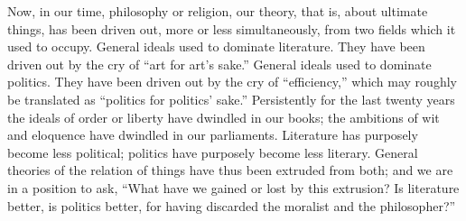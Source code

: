 Now, in our time, philosophy or religion, our theory, that is, about ultimate things, has been driven out, more or less simultaneously, from two fields which it used to occupy. General ideals used to dominate literature. They have been driven out by the cry of “art for art’s sake.” General ideals used to dominate politics. They have been driven out by the cry of “efficiency,” which may roughly be translated as “politics for politics’ sake.” Persistently for the last twenty years the ideals of order or liberty have dwindled in our books; the ambitions of wit and eloquence have dwindled in our parliaments. Literature has purposely become less political; politics have purposely become less literary. General theories of the relation of things have thus been extruded from both; and we are in a position to ask, “What have we gained or lost by this extrusion? Is literature better, is politics better, for having discarded the moralist and the philosopher?”

